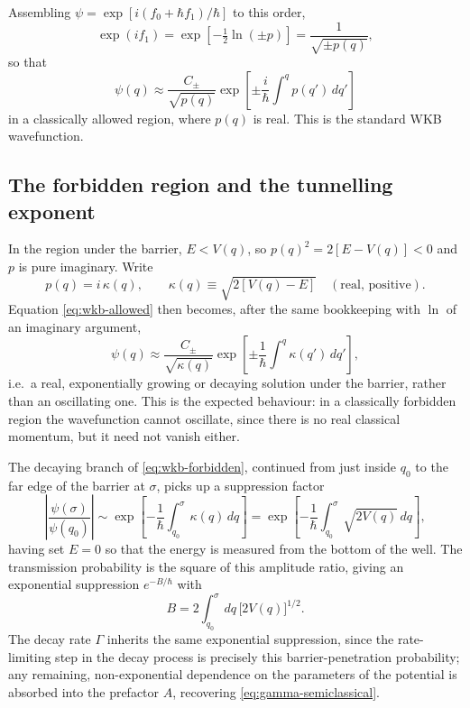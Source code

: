 Assembling $\psi = \exp[i(f_0+\hbar f_1)/\hbar]$ to this order,
\begin{equation}
\exp(if_1) = \exp\!\left[-\tfrac{1}{2}\ln(\pm p)\right] = \frac{1}{\sqrt{\pm p(q)}},
\label{eq:exp-if1}
\end{equation}
so that
\begin{equation}
\psi(q) \approx \frac{C_\pm}{\sqrt{p(q)}}\exp\!\left[\pm\frac{i}{\hbar}\int^q p(q')\,dq'\right]
\label{eq:wkb-allowed}
\end{equation}
in a classically allowed region, where $p(q)$ is real. This is the standard WKB wavefunction.

\subsection{The forbidden region and the tunnelling exponent}

In the region under the barrier, $E < V(q)$, so $p(q)^2 = 2[E-V(q)] < 0$ and $p$ is pure imaginary. Write
\begin{equation}
p(q) = i\,\kappa(q), \qquad \kappa(q) \equiv \sqrt{2[V(q)-E]} \quad (\text{real, positive}).
\label{eq:kappa-def}
\end{equation}
Equation \eqref{eq:wkb-allowed} then becomes, after the same bookkeeping with $\ln$ of an imaginary argument,
\begin{equation}
\psi(q) \approx \frac{C_\pm}{\sqrt{\kappa(q)}}\exp\!\left[\pm\frac{1}{\hbar}\int^q \kappa(q')\,dq'\right],
\label{eq:wkb-forbidden}
\end{equation}
i.e.\ a real, exponentially growing or decaying solution under the barrier, rather than an oscillating one. This is the expected behaviour: in a classically forbidden region the wavefunction cannot oscillate, since there is no real classical momentum, but it need not vanish either.

The decaying branch of \eqref{eq:wkb-forbidden}, continued from just inside $q_0$ to the far edge of the barrier at $\sigma$, picks up a suppression factor
\begin{equation}
\left|\frac{\psi(\sigma)}{\psi(q_0)}\right| \sim \exp\!\left[-\frac{1}{\hbar}\int_{q_0}^{\sigma}\kappa(q)\,dq\right] = \exp\!\left[-\frac{1}{\hbar}\int_{q_0}^{\sigma}\sqrt{2V(q)}\,dq\right],
\label{eq:suppression-factor}
\end{equation}
having set $E=0$ so that the energy is measured from the bottom of the well. The transmission probability is the square of this amplitude ratio, giving an exponential suppression $e^{-B/\hbar}$ with
\begin{equation}
B = 2\int_{q_0}^{\sigma} dq\,\big[2V(q)\big]^{1/2}.
\label{eq:B-definition}
\end{equation}
The decay rate $\Gamma$ inherits the same exponential suppression, since the rate-limiting step in the decay process is precisely this barrier-penetration probability; any remaining, non-exponential dependence on the parameters of the potential is absorbed into the prefactor $A$, recovering \eqref{eq:gamma-semiclassical}.

